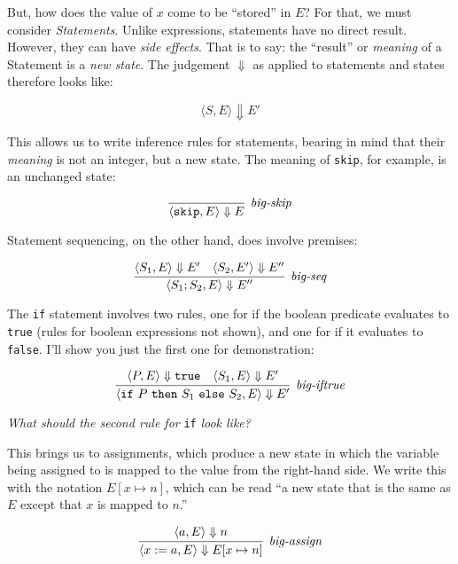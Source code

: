 \documentclass[11pt]{article}
\begin{document}
But, how does the value of $x$ come to be ``stored'' in $E$?  For that, we must
consider \WhileLang \emph{Statements}.  Unlike expressions, statements have no
direct result.  However, they can have \emph{side effects}.  That is to say: the
``result'' or \emph{meaning} of a Statement is a \emph{new state}.  The
judgement $\Downarrow$ as applied to statements and states therefore looks like:

\begin{equation*}
\langle S, E \rangle \Downarrow E' 
\end{equation*}

This allows us to write inference rules for statements, bearing in mind that
their \emph{meaning} is not an integer, but a new state.  The meaning of
\texttt{skip}, for example, is an unchanged state:

\begin{equation*}
\infer[\textit{big-skip}]{\langle \mathtt{skip}, E  \rangle \Downarrow E}{}
\end{equation*}

\noindent Statement sequencing, on the other hand, does involve premises:

\[
\infer[\textit{big-seq}]{\langle S_1 ; S_2, E \rangle \Downarrow E''}{\langle S_1,E \rangle \Downarrow E'
 & \langle S_2, E' \rangle \Downarrow E''}
\]

The \texttt{if} statement involves two rules, one for if the boolean
predicate evaluates to \texttt{true} (rules for boolean expressions not shown),
and one for if it evaluates to \texttt{false}.  I'll show you just the first one
for demonstration:

\[
\infer[\textit{big-iftrue}]{\langle\mathtt{if}~P~\mathtt{then}~S_1~\mathtt{else}~S_2, E \rangle \Downarrow
  E'}{\langle P, E \rangle \Downarrow \mathtt{true} & \langle S_1, E \rangle \Downarrow
  E'}
\]

\noindent \emph{What should the second rule for} \texttt{if} \emph{look like?}

\vspace{1em}

\noindent This brings us to assignments, which produce a new state in which the variable being assigned to is mapped to the value from the right-hand side.  We write this with the notation $E[x \mapsto n]$, which can be read ``a new state that is the same as $E$ except that $x$ is mapped to $n$.''

\begin{equation*}
\infer[\textit{big-assign}]{\langle x := a, E \rangle \Downarrow E[x \mapsto n]} {\langle a, E \rangle \Downarrow n} 
\end{equation*}
\end{document}
